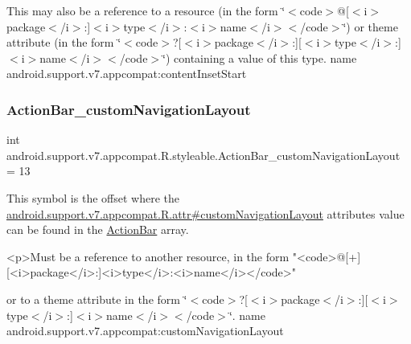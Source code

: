 This may also be a reference to a resource (in the form \char`\"{}$<$code$>$@\mbox{[}$<$i$>$package$<$/i$>$\+:\mbox{]}$<$i$>$type$<$/i$>$\+:$<$i$>$name$<$/i$>$$<$/code$>$\char`\"{}) or theme attribute (in the form \char`\"{}$<$code$>$?\mbox{[}$<$i$>$package$<$/i$>$\+:\mbox{]}\mbox{[}$<$i$>$type$<$/i$>$\+:\mbox{]}$<$i$>$name$<$/i$>$$<$/code$>$\char`\"{}) containing a value of this type.  name android.\+support.\+v7.\+appcompat\+:content\+Inset\+Start \mbox{\label{classandroid_1_1support_1_1v7_1_1appcompat_1_1R_1_1styleable_a33a27d2f5325f52eae7806c7b4498719}} 
\subsubsection{\texorpdfstring{Action\+Bar\+\_\+custom\+Navigation\+Layout}{ActionBar\_customNavigationLayout}}
{\footnotesize\ttfamily int android.\+support.\+v7.\+appcompat.\+R.\+styleable.\+Action\+Bar\+\_\+custom\+Navigation\+Layout = 13\hspace{0.3cm}{\ttfamily [static]}}

This symbol is the offset where the \hyperlink{classandroid_1_1support_1_1v7_1_1appcompat_1_1R_1_1attr_aa4815525f2f6a0d8ad7614131e4db6d6}{android.\+support.\+v7.\+appcompat.\+R.\+attr\#custom\+Navigation\+Layout} attribute\textquotesingle{}s value can be found in the \hyperlink{classandroid_1_1support_1_1v7_1_1appcompat_1_1R_1_1styleable_a5941dc15714398e9ec9afaa0155cc1cf}{Action\+Bar} array.

\begin{DoxyVerb}      <p>Must be a reference to another resource, in the form "<code>@[+][<i>package</i>:]<i>type</i>:<i>name</i></code>"
\end{DoxyVerb}
 or to a theme attribute in the form \char`\"{}$<$code$>$?\mbox{[}$<$i$>$package$<$/i$>$\+:\mbox{]}\mbox{[}$<$i$>$type$<$/i$>$\+:\mbox{]}$<$i$>$name$<$/i$>$$<$/code$>$\char`\"{}.  name android.\+support.\+v7.\+appcompat\+:custom\+Navigation\+Layout \mbox{\label{classandroid_1_1support_1_1v7_1_1appcompat_1_1R_1_1styleable_acfe0523a711e29705cc7023bc685b2ed}} 
